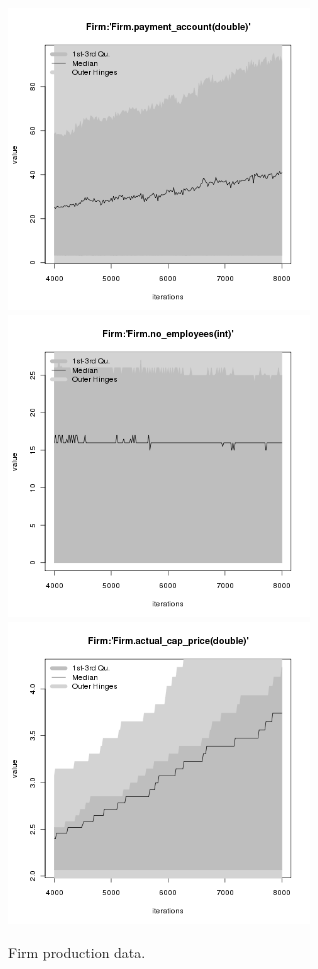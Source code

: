 \begin{figure}[H!]
\begin{minipage}{17cm}
\includegraphics[width=8cm]{./png/tax_0.05/Firm-payment_account.png}\\
\includegraphics[width=8cm]{./png/tax_0.05/Firm-no_employees.png}
\includegraphics[width=8cm]{./png/tax_0.05/Firm-actual_cap_price.png}
\end{minipage}
\caption{Firm production data.}
\label{Figure: Firm Production}
\end{figure}


